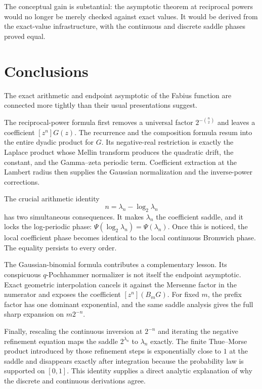 \documentclass[11pt,oneside]{article}
\theoremstyle{definition}
\theoremstyle{remark}
\begin{document}
The conceptual gain is substantial: the asymptotic theorem at reciprocal powers would no longer be merely checked against exact values.  It would be derived from the exact-value infrastructure, with the continuous and discrete saddle phases proved equal.

\section{Conclusions}
\label{sec:conclusions}

The exact arithmetic and endpoint asymptotic of the Fabius function are connected more tightly than their usual presentations suggest.

The reciprocal-power formula first removes a universal factor
$2^{-\binom n2}$ and leaves a coefficient $[z^n]G(z)$.  The recurrence and the composition formula resum into the entire dyadic product for $G$.  Its negative-real restriction is exactly the Laplace product whose Mellin transform produces the quadratic drift, the constant, and the Gamma--zeta periodic term.  Coefficient extraction at the Lambert radius then supplies the Gaussian normalization and the inverse-power corrections.

The crucial arithmetic identity
\[
 n=\lambda_n-\log_2\lambda_n
\]
has two simultaneous consequences.  It makes $\lambda_n$ the coefficient saddle, and it locks the log-periodic phase:
$\Psi(\log_2\lambda_n)=\Psi(\lambda_n)$.  Once this is noticed, the local coefficient phase becomes identical to the local continuous Bromwich phase.  The equality persists to every order.

The Gaussian-binomial formula contributes a complementary lesson.  Its conspicuous
$q$-Pochhammer normalizer is not itself the endpoint asymptotic.  Exact geometric interpolation cancels it against the Mersenne factor in the numerator and exposes the coefficient
$[z^n](B_mG)$.  For fixed $m$, the prefix factor has one dominant exponential, and the same saddle analysis gives the full sharp expansion on $m2^{-n}$.

Finally, rescaling the continuous inversion at $2^{-n}$ and iterating the negative refinement equation maps the saddle $2^{\lambda_n}$ to $\lambda_n$ exactly.  The finite Thue--Morse product introduced by those refinement steps is exponentially close to $1$ at the saddle and disappears exactly after integration because the probability law is supported on $[0,1]$.  This identity supplies a direct analytic explanation of why the discrete and continuous derivations agree.
\end{document}
